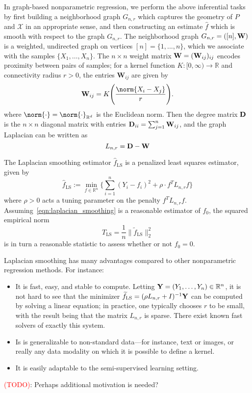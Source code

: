 \documentclass[twoside]{article}
\newcommand{\Reals}{\mathbb{R}}
\newcommand{\1}{\mathbf{1}}
\newcommand{\Rd}{\Reals^d}
\newcommand{\Lap}{L}
\newcommand{\mc}[1]{\mathcal{#1}}
\newcommand{\wt}[1]{\widetilde{#1}}
\newcommand{\wh}[1]{\widehat{#1}}
\newcommand{\LS}{\mathrm{LS}}
\theoremstyle{definition}
\theoremstyle{remark}
\begin{document}
In graph-based nonparametric regression, we perform the above inferential tasks by first building a neighborhood graph $G_{n,r}$ which captures the geometry of $P$ and $\mc{X}$ in an appropriate sense, and then constructing an estimate $\wh{f}$ which is smooth with respect to the graph $G_{n,r}$. The neighborhood graph $G_{n,r} = ([n],{\bf W})$ is a weighted, undirected graph on vertices $[n] = \{1,...,n\}$, which we associate with the samples $\{X_1,\ldots,X_n\}$. The $n \times n$ weight matrix ${\bf W} = ({\bf W}_{ij})_{ij}$ encodes proximity between pairs of samples; for a kernel function $K: [0,\infty) \to \Reals$ and connectivity radius $r > 0$, the entries $\mathbf{W}_{ij}$ are given by
\begin{equation*}
\label{eqn:neighborhood_graph}
{\bf W}_{ij} = K\Biggl(\frac{\norm{X_i - X_j}}{r}\Biggr).
\end{equation*}
where $\norm{\cdot} = \norm{\cdot}_{\Rd}$ is the Euclidean norm. Then the degree matrix ${\bf D}$ is the $n \times n$ diagonal matrix with entries ${\bf D}_{ii} = \sum_{j = 1}^{n}{\bf W}_{ij}$, and the graph Laplacian can be written as
\begin{equation}
\label{eqn:graph_Laplacian}
\Lap_{n,r} = \bf{D} - \bf{W}
\end{equation}

The Laplacian smoothing estimator $\wh{f}_{\LS}$ \citep{smola2003} is a penalized least squares estimator, given by
\begin{equation}
\label{eqn:laplacian_smoothing}
\wh{f}_{\LS} := \min_{f \in \Reals^n} \biggl\{\sum_{i = 1}^{n}(Y_i - f_i)^2 + \rho \cdot f^T \Lap_{n,r} f \biggr\}
\end{equation}
where $\rho > 0$ acts a tuning parameter on the penalty $f^T \Lap_{{n,r}} f$.
Assuming~\eqref{eqn:laplacian_smoothing} is a reasonable estimator of $f_0$, the squared empirical norm
\begin{equation}
T_{\LS} = \frac{1}{n}\bigl\|\wt{f}_{\LS}\bigr\|_2^2 \label{eqn:laplacian_smoothing_test}
\end{equation}
is in turn a reasonable statistic to assess whether or not $f_0 = 0$. 

Laplacian smoothing has many advantages compared to other nonparametric regression methods. For instance:
\begin{itemize}
	\item It is fast, easy, and stable to compute. Letting ${\bf Y} = (Y_1,\ldots,Y_n) \in \Reals^n$, it is not hard to see that the minimizer $\wt{f}_{\LS} = (\rho \Lap_{n,r} + I)^{-1}{\bf Y}$ can be computed by solving a linear equation; in practice, one typically chooses $r$ to be small, with the result being that the matrix $\Lap_{n,r}$ is sparse. There exist known fast solvers of exactly this system.
	\item Is is generalizable to non-standard data---for instance, text or images, or really any data modality on which it is possible to define a kernel.
	\item It is easily adaptable to the semi-supervised learning setting. 
\end{itemize}
\textcolor{red}{(TODO)}: Perhaps additional motivation is needed?
\end{document}
